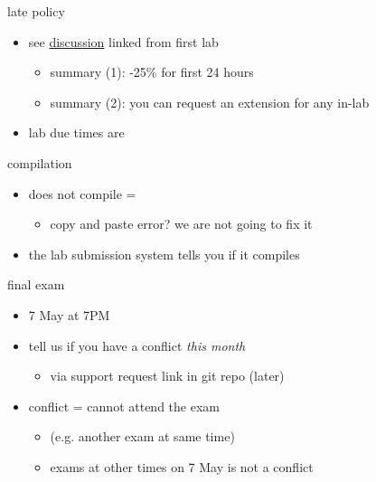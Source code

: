 \begin{frame}{late policy}
    \begin{itemize}
    \item see \href{https://markfloryan.github.io/pdr/uva/labduedates.html}{discussion} linked from first lab
        \begin{itemize}
            \item summary (1): -25\% for first 24 hours
            \item summary (2): you can request an extension for any in-lab
        \end{itemize}
        \vspace{.5cm}
    \item lab due times are 
    \end{itemize}
\end{frame}

\begin{frame}{compilation}
    \begin{itemize}
    \item does not compile = 
        \begin{itemize}
        \item copy and paste error? we are not going to fix it
        \end{itemize}
    \vspace{.5cm}
    \item the lab submission system tells you if it compiles
    \end{itemize}
\end{frame}

\begin{frame}{final exam}
    \begin{itemize}
    \item 7 May at 7PM
    \item tell us if you have a conflict \textit{this month}
        \begin{itemize}
        \item via support request link in git repo (later)
        \end{itemize}
    \item conflict = cannot attend the exam
        \begin{itemize}
        \item (e.g. another exam at same time)
        \item exams at other times on 7 May is not a conflict
        \end{itemize}
    \end{itemize}
\end{frame}
